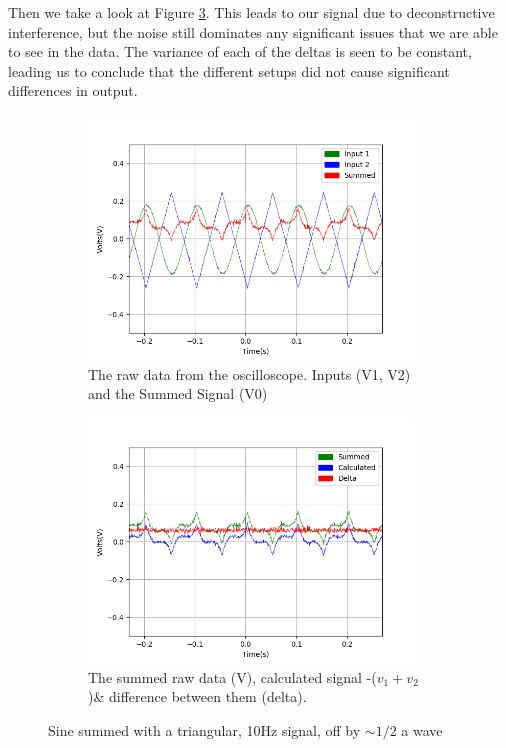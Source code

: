 Then we take a look at Figure \ref{fig:sum_9}. This leads to our signal due to deconstructive interference, but the noise still dominates any significant issues that we are able to see in the data. The variance of each of the deltas is seen to be constant, leading us to conclude that the different setups did not cause significant differences in output.
\begin{figure}[h!]
\centering
\begin{subfigure}[t]{.475\textwidth}
  \centering
  \includegraphics[width=0.95\textwidth, height=0.22\textheight]{figures/Summing/scope_9raw.png}
  \caption{The raw data from the oscilloscope. Inputs (V1, V2) and the Summed Signal (V0)}
 \label{fig:sum_9_og_data}
\end{subfigure}\hfill
\begin{subfigure}[t]{.475\textwidth}
  \centering
  \includegraphics[width=0.95\textwidth, height=0.22\textheight]{figures/Summing/scope_9.png}
  \caption{The summed raw data (V), calculated signal -($v_1 + v_2$)\& difference between them (delta).}
\label{fig:sum_9_calc_data}
\end{subfigure}
\caption{Sine summed with a triangular, 10Hz signal, off by $\sim 1/2$ a wave}
\label{fig:sum_9}
\end{figure}
